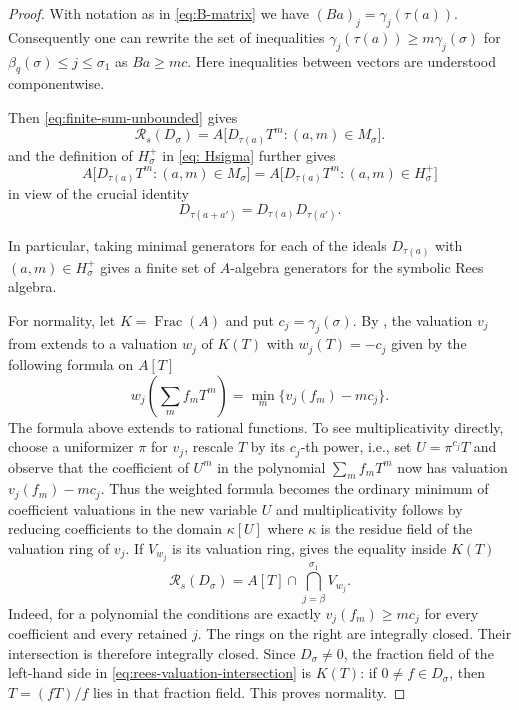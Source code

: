 \documentclass[11pt,reqno]{amsart}
\numberwithin{equation}{subsection}
\theoremstyle{definition}
\theoremstyle{remark}
\newcommand{\cR}{\mathcal R}
\begin{document}
\begin{proof}
With notation as in \eqref{eq:B-matrix} we have  $(Ba)_j=\gamma_j(\tau(a))$. Consequently one can rewrite the set of inequalities $\gamma_j(\tau(a)) \geq m\gamma_j(\sigma)$ for $\beta_q(\sigma)\leq j\leq \sigma_1$ as $Ba\geq mc$. Here inequalities between vectors are understood
componentwise.


Then \eqref{eq:finite-sum-unbounded} gives 
\[
\mathcal{R}_s(D_\sigma)
  =A\bigl[
       D_{\tau(a)}T^m:(a,m)\in M_\sigma  \bigr].
\]
and the definition of $H_\sigma^+$ in \eqref{eq: Hsigma} further gives
\[
 A\bigl[
       D_{\tau(a)}T^m:(a,m)\in M_\sigma  \bigr] =A\bigl[
       D_{\tau(a)}T^m:(a,m)\in H_\sigma^+ \bigr]
\]
in view of the crucial identity
\[
D_{\tau(a+a')}=D_{\tau(a)}D_{\tau(a')}.
\]

In particular, taking minimal generators for each of the ideals $D_{\tau(a)}$ with $(a,m)\in H_\sigma^+$ gives a finite set of $A$-algebra generators for the symbolic Rees algebra.




For normality, let $K=\operatorname{Frac}(A)$ and put
$c_j=\gamma_j(\sigma)$. 
By \cite[Ch.~VI, \S10, no.~1, Lemma~1]{Bourbaki}, the valuation $v_j$ from  extends to a valuation $w_j$ of
$K(T)$ with $w_j(T)=-c_j$ given by
the following formula on $A[T]$
\[
w_j\!\left(\sum_m f_mT^m\right)
   =\min_m\{v_j(f_m)-mc_j\}.
\]
The formula above extends to rational functions.
To see multiplicativity directly, choose a uniformizer $\pi$ for $v_j$, rescale $T$ by its $c_j$-th power, i.e., set $U=\pi^{c_j}T$ and observe that the coefficient of $U^m$ in the polynomial $\sum_m f_mT^m$ now has valuation $v_j(f_m)-mc_j$. Thus the weighted formula becomes the ordinary minimum of coefficient valuations in the new variable $U$ and multiplicativity follows by reducing coefficients to the domain $\kappa[U]$ where $\kappa$ is the residue field of the valuation ring of $v_j$.
 If $V_{w_j}$ is its valuation
ring,  gives the equality inside $K(T)$
\begin{equation}\label{eq:rees-valuation-intersection}
\cR_s(D_\sigma)=A[T]\cap\bigcap_{j=\beta}^{\sigma_1}V_{w_j}.
\end{equation}
Indeed, for a polynomial the conditions are exactly
$v_j(f_m)\ge mc_j$ for every coefficient and every retained $j$. The rings on the right are integrally closed. Their intersection is therefore integrally closed. Since $D_\sigma\ne0$, the fraction field
of the left-hand side in \eqref{eq:rees-valuation-intersection} is $K(T)$: if $0\ne f\in D_\sigma$, then $T=(fT)/f$ lies in that fraction field. This proves normality.


\end{proof}
\end{document}
